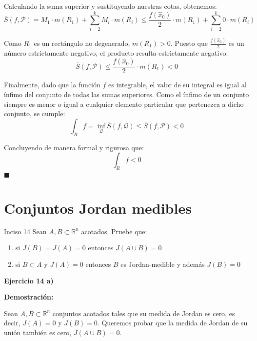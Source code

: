 \documentclass[11pt,letterpaper]{article}
\begin{document}
Calculando la suma superior y sustituyendo nuestras cotas, obtenemos:
\begin{equation*}
\overline{S}(f, \mathcal{P}) = M_1 \cdot m(R_1) + \sum_{i=2}^{k} M_i \cdot m(R_i) \le \frac{f(\hat{x}_0)}{2} \cdot m(R_1) + \sum_{i=2}^{k} 0 \cdot m(R_i)
\end{equation*}

Como $R_1$ es un rectángulo no degenerado, $m(R_1) > 0$. Puesto que $\frac{f(\hat{x}_0)}{2}$ es un número estrictamente negativo, el producto resulta estrictamente negativo:
\begin{equation*}
\overline{S}(f, \mathcal{P}) \le \frac{f(\hat{x}_0)}{2} \cdot m(R_1) < 0
\end{equation*}

Finalmente, dado que la función $f$ es integrable, el valor de su integral es igual al ínfimo del conjunto de todas las sumas superiores. Como el ínfimo de un conjunto siempre es menor o igual a cualquier elemento particular que pertenezca a dicho conjunto, se cumple:
\begin{equation*}
\int_R f = \inf_{\mathcal{Q}} \overline{S}(f, \mathcal{Q}) \le \overline{S}(f, \mathcal{P}) < 0
\end{equation*}

Concluyendo de manera formal y rigurosa que:
\begin{equation*}
\int_R f < 0
\end{equation*}
\hfill $\blacksquare$

\section*{Conjuntos Jordan medibles}

\begin{inciso}{Inciso 14}
Sean $A, B\subset\mathbb{R}^{n}$ acotados. Pruebe que:
\begin{enumerate}[label=\alph*)]
    \item si $J(B)=J(A)=0$ entonces $J(A\cup B)=0$
    \item si $B\subset A$ y $J(A)=0$ entonces $B$ es Jordan-medible y además $J(B)=0$
\end{enumerate}
\end{inciso}

\textbf{Ejercicio 14 a)}

\textbf{Demostración:}

Sean $A, B \subset \mathbb{R}^n$ conjuntos acotados tales que su medida de Jordan es cero, es decir, $J(A) = 0$ y $J(B) = 0$. Queremos probar que la medida de Jordan de su unión también es cero, $J(A \cup B) = 0$.
\end{document}
